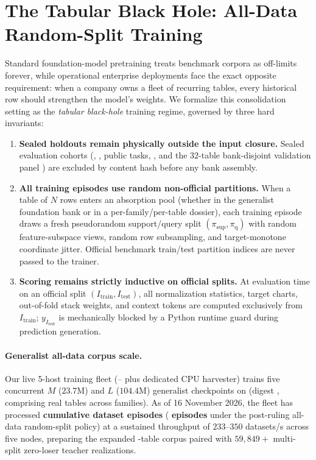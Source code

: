 \section{The Tabular Black Hole: All-Data Random-Split Training}
\label{sec:blackhole}

Standard foundation-model pretraining treats benchmark corpora as off-limits forever, while operational enterprise deployments face the exact opposite requirement: when a company owns a fleet of recurring tables, every historical row should strengthen the model's weights. We formalize this consolidation setting as the \emph{tabular black-hole} training regime, governed by three hard invariants:

\begin{enumerate}
  \item \textbf{Sealed holdouts remain physically outside the input closure.} Sealed evaluation cohorts (, ,  public tasks, , and the $32$-table bank-disjoint validation panel ) are excluded by content hash before any bank assembly.
  \item \textbf{All training episodes use random non-official partitions.} When a table of $N$ rows enters an absorption pool (whether in the generalist foundation bank or in a per-family/per-table dossier), each training episode draws a fresh pseudorandom support/query split $(\pi_{\mathrm{sup}}, \pi_{\mathrm{q}})$ with random feature-subspace views, random row subsampling, and target-monotone coordinate jitter. Official benchmark train/test partition indices are never passed to the trainer.
  \item \textbf{Scoring remains strictly inductive on official splits.} At evaluation time on an official split $(I_{\mathrm{train}}, I_{\mathrm{test}})$, all normalization statistics, target charts, out-of-fold stack weights, and context tokens are computed exclusively from $I_{\mathrm{train}}$; $y_{I_{\mathrm{test}}}$ is mechanically blocked by a Python runtime  guard during prediction generation.
\end{enumerate}

\paragraph{Generalist all-data corpus scale.}
Our live 5-host training fleet (-- plus dedicated CPU harvester) trains five concurrent $M$ ($23.7\mathrm{M}$) and $L$ ($104.4\mathrm{M}$) generalist checkpoints on  (digest , comprising \BHRFiveTables{} real tables across \BHRFiveFamilies{} families). As of 16 November 2026, the fleet has processed \textbf{\BHTotalDatasetsFed{} cumulative dataset episodes} (\textbf{\BHAllDataDatasetsFed{} episodes} under the post-ruling all-data random-split policy) at a sustained throughput of $233$--$350$ datasets/s across five nodes, preparing the expanded \BHRFSixTargetTables{}-table  corpus paired with $59{,}849+$ multi-split zero-loser teacher realizations.

